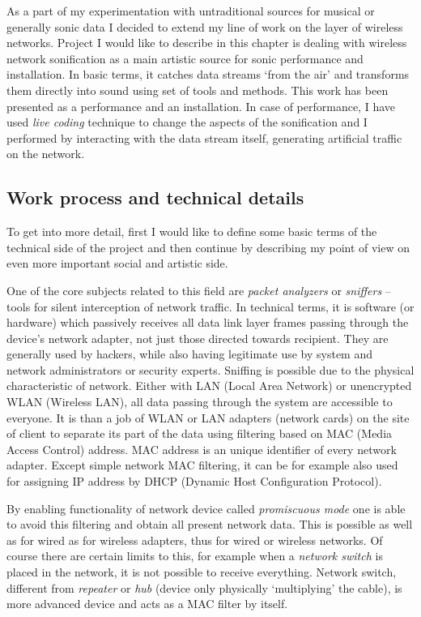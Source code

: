 \documentclass[11pt,a4paper,oneside]{report}
\begin{document}
As a part of my experimentation with untraditional sources for musical or generally sonic data I decided to extend my line of work on the layer of wireless networks. Project I would like to describe in this chapter is dealing with wireless network sonification as a main artistic source for sonic performance and installation. In basic terms, it catches data streams `from the air' and transforms them directly into sound using set of tools and methods. This work has been presented as a performance and an installation. In case of performance, I have used \emph{live coding} technique to change the aspects of the sonification and I performed by interacting with the data stream itself, generating artificial traffic on the network.

\subsection{Work process and technical details}

To get into more detail, first I would like to define some basic terms of the technical side of the project and then continue by describing my point of view on even more important social and artistic side.

One of the core subjects related to this field are \emph{packet analyzers} or \emph{sniffers} – tools for silent interception of network traffic. In technical terms, it is software (or hardware) which passively receives all data link layer frames passing through the device’s network adapter, not just those directed towards recipient. They are generally used by hackers, while also having legitimate use by system and network administrators or security experts. Sniffing is possible due to the physical characteristic of network. Either with LAN (Local Area Network) or unencrypted WLAN (Wireless LAN), all data passing through the system are accessible to everyone. It is than a job of WLAN or LAN adapters (network cards) on the site of client to separate its part of the data using filtering based on MAC (Media Access Control) address. MAC address is an unique identifier of every network adapter. Except simple network MAC filtering, it can be for example also used for assigning IP address by DHCP (Dynamic Host Configuration Protocol).

By enabling functionality of network device called \emph{promiscuous mode} one is able to avoid this filtering and obtain all present network data. This is possible as well as for wired as for wireless adapters, thus for wired or wireless networks. Of course there are certain limits to this, for example when a \emph{network switch} is placed in the network, it is not possible to receive everything. Network switch, different from \emph{repeater} or \emph{hub} (device only physically `multiplying' the cable), is more advanced device and acts as a MAC filter by itself. \cite{Pallavi2012}
\end{document}
